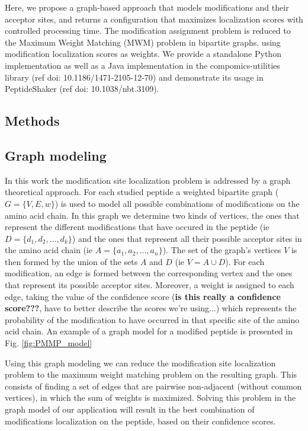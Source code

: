 \documentclass{bioinfo}
\begin{document}
Here, we propose a graph-based approach that models modifications and their acceptor sites, and returns a configuration that maximizes localization scores with controlled processing time. The modification assignment problem is reduced to the Maximum Weight Matching (MWM) problem in bipartite graphs, using modification localization scores as weights. We provide a standalone Python implementation as well as a Java implementation in the compomics-utilities library (ref doi: 10.1186/1471-2105-12-70) and demonstrate its usage in PeptideShaker (ref doi: 10.1038/nbt.3109).


\begin{methods}
\section{Methods}

\subsection{Graph modeling}

In this work the modification site localization problem is addressed by a graph theoretical approach. For each studied peptide a weighted bipartite graph ($G = \{V,E,w\}$) is used to model all possible combinations of modifications on the amino acid chain. In this graph we determine two kinds of vertices, the ones that represent the different modifications that have occured in the peptide (ie $D = \{d_1, d_2, \dots, d_k\}$) and the ones that represent all their possible acceptor sites in the amino acid chain (ie $A = \{a_1, a_2, \dots, a_n\}$). The set of the graph's vertices $V$ is then formed by the union of the sets $A$ and $D$ (ie $V = A \cup D$). For each modification, an edge is formed between the corresponding vertex and the ones that represent its possible acceptor sites. Moreover, a weight is assigned to each edge, taking the value of the confidence score (\textbf{is this really a confidence score???}, have to better describe the scores we're using...) which represents the probability of the modification to have occurred in that specific site of the amino acid chain. An example of a graph model for a modified peptide is presented in Fig. \ref{fig:PMMP_model}

Using this graph modeling we can reduce the modification site localization problem to the maximum weight matching problem on the resulting graph. This consists of finding a set of edges that are pairwise non-adjacent (without common vertices), in which the sum of weights is maximized. Solving this problem in the graph model of our application will result in the best combination of modifications localization on the peptide, based on their confidence scores. 


\end{methods}
\end{document}
